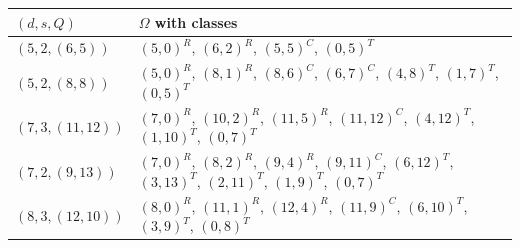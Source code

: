 \begin{tabular}{@{}lp{9.5cm}@{}}
\toprule $(d,s,Q)$ & $\Omega$ with classes\\\midrule
$(5,2,(6,5))$ & $(5,0)^{R}$, $(6,2)^{R}$, $(5,5)^{C}$, $(0,5)^{T}$\\
$(5,2,(8,8))$ & $(5,0)^{R}$, $(8,1)^{R}$, $(8,6)^{C}$, $(6,7)^{C}$, $(4,8)^{T}$, $(1,7)^{T}$, $(0,5)^{T}$\\
$(7,3,(11,12))$ & $(7,0)^{R}$, $(10,2)^{R}$, $(11,5)^{R}$, $(11,12)^{C}$, $(4,12)^{T}$, $(1,10)^{T}$, $(0,7)^{T}$\\
$(7,2,(9,13))$ & $(7,0)^{R}$, $(8,2)^{R}$, $(9,4)^{R}$, $(9,11)^{C}$, $(6,12)^{T}$, $(3,13)^{T}$, $(2,11)^{T}$, $(1,9)^{T}$, $(0,7)^{T}$\\
$(8,3,(12,10))$ & $(8,0)^{R}$, $(11,1)^{R}$, $(12,4)^{R}$, $(11,9)^{C}$, $(6,10)^{T}$, $(3,9)^{T}$, $(0,8)^{T}$\\
\bottomrule\end{tabular}